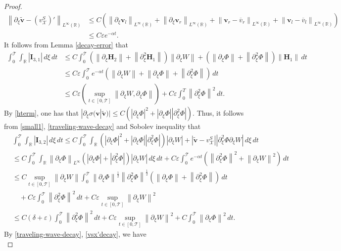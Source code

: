 \documentclass[12pt,reqno]{amsart}
\numberwithin{equation}{section}
\newcommand{\norm}[1]{\left\lVert #1 \right\rVert}
\newcommand{\abs}[1]{\left\lvert #1 \right\rvert}
\def\p{\partial}
\def\R{\mathbb{R}}
\def\T{\mathcal{T}}
\def\supt{\mathop{sup}\limits_{t \in [0,\mathcal{T}]}}
\def\vsx{v^S_{\mathcal{X}}}
\def\avl{\overline{v}_l}
\def\avr{\overline{v}_r}
\begin{document}
\begin{proof}
\begin{align}
			\norm{\p_{\xi}\mathbf{\tilde{v}}-(\vsx)'}_{L^{\infty}(\R)}&\leq C(\norm{\p_{\xi}\mathbf{v}_l}_{L^{\infty}(\R)}+\norm{\p_{\xi}\mathbf{v}_r}_{L^{\infty}(\R)}+\norm{\mathbf{v}_r-\avr}_{L^{\infty}(\R)}+\norm{\mathbf{v}_l-\avl}_{L^{\infty}(\R)})\nonumber\\
			&\leq C\varepsilon e^{-\alpha t}.
		\end{align}
	It follows from Lemma \ref{decay-error} that
		\begin{align}\label{high1.1}
		\int_{0}^{\T}\int_{\R}|\mathbf{I}_{3,1}|\,d\xi\,dt&\leq C\int_{0}^{\T} (\norm{\p_{\xi}\mathbf{H}_2}+\norm{\p^2_{\xi}\mathbf{H}_1})\norm{\p_{\xi}W}+(\norm{\p_{\xi}\Phi}+\norm{\p^2_{\xi}\Phi})\norm{\mathbf{H}_1} \,dt\nonumber\\
		&\leq C\varepsilon\int_{0}^{\T}e^{-\alpha t} (\norm{\p_{\xi}W}+\norm{\p_{\xi}\Phi}+\norm{\p^2_{\xi}\Phi}) \,dt\\
		&\leq C\varepsilon(\supt\norm{\p_{\xi}W,\p_{\xi}\Phi})+C\varepsilon\int_{0}^{T}\norm{\p^2_{\xi}\Phi}^2\,dt.\nonumber
		\end{align}
	By \eqref{hterm}, one has that $|\p_{\xi}\sigma(\mathbf{v}|\mathbf{\tilde{v}})|\leq C(\abs{\p_{\xi}\Phi}^2+\abs{\p_{\xi}\Phi}\abs{\p^2_{\xi}\Phi})$. Thus, it follows from \eqref{small1}, \eqref{traveling-wave-decay} and 
	Sobolev inequality that
		\begin{align}\label{high1.2}
			&\int_{0}^{\T}\int_{\R}|\mathbf{I}_{3,2}|\,d\xi\,dt\leq C\int_{0}^{\T}\int_{\R}(\abs{\p_{\xi}\Phi}^2+\abs{\p_{\xi}\Phi}\abs{\p^2_{\xi}\Phi})|\p_{\xi}W|+|\mathbf{\tilde{v}}-\vsx||\p^2_{\xi}\Phi\p_{\xi}W|\,d\xi\,dt\nonumber\\
			&\leq C\int_{0}^{\T}\int_{\R}\norm{\p_{\xi}{\Phi}}_{L^{\infty}}(\abs{\p_{\xi}\Phi}+\abs{\p^2_{\xi}\Phi})\abs{\p_{\xi}W}  \,d\xi\,dt+C \varepsilon\int_{0}^{\T} e^{-\alpha t}(\norm{\p^2_{\xi}\Phi}^2+\norm{\p_{\xi}W}^2)\,dt\nonumber\\
			&\leq C\supt\norm{\p_{\xi}W}\int_{0}^{\T} \norm{\p_{\xi}\Phi}^{\frac{1}{2}}\norm{\p^2_{\xi}\Phi}^{\frac{1}{2}}(\norm{\p_{\xi}\Phi}+\norm{\p^2_{\xi}\Phi})\,dt\\
			&\quad+C\varepsilon\int_{0}^{\T}\norm{\p^2_{\xi}\Phi}^2\,dt+C\varepsilon\supt\norm{\p_{\xi}W}^2\nonumber\\
			&\leq C(\delta+\varepsilon)\int_{0}^{\T}\norm{\p^2_{\xi}\Phi}^2\,dt+C\varepsilon\supt\norm{\p_{\xi}W}^2+C\int_{0}^{\T}\norm{\p_{\xi}\Phi}^2\,dt.\nonumber
		\end{align}
	By \eqref{traveling-wave-decay}, \eqref{vsx'decay}, we have 
	\begin{equation}\label{high1.3}

\end{equation}
\end{proof}
\end{document}
